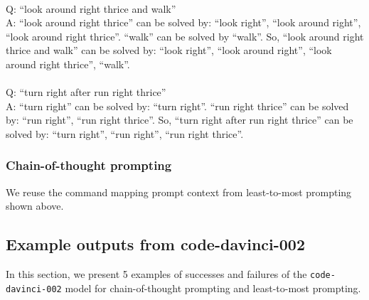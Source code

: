 { \\
Q: ``look around right thrice and walk'' \\
A: ``look around right thrice'' can be solved by: ``look right'', ``look around right'', ``look around right thrice''. ``walk'' can be solved by ``walk''. So, ``look around right thrice and walk'' can be solved by: ``look right'', ``look around right'', ``look around right thrice'', ``walk''. \\
 \\
Q: ``turn right after run right thrice'' \\
A: ``turn right'' can be solved by: ``turn right''. ``run right thrice'' can be solved by: ``run right'', ``run right thrice''. So, ``turn right after run right thrice'' can be solved by: ``turn right'', ``run right'', ``run right thrice''.
}

\noindent
\subsubsection{Chain-of-thought prompting}
\noindent
We reuse the command mapping prompt context from least-to-most prompting shown above.



\subsection{Example outputs from code-davinci-002}
\label{app:scan-outputs}

In this section, we present 5 examples of successes and failures of the \texttt{code-davinci-002} model for chain-of-thought prompting and least-to-most prompting.

